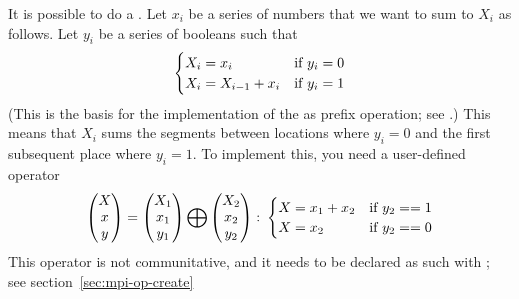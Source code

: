 It is possible to do a . Let $x_i$ be a series of numbers
that we want to sum to $X_i$ as follows. Let $y_i$ be a series of booleans such that
\[ 
\begin{cases}
  X_i=x_i&\hbox{if $y_i=0$}\\
  X_i=X_{i-1}+x_i&\hbox{if $y_i=1$}
\end{cases}
\]
(This is the basis for the implementation of the 
as prefix operation; see .)
This means that $X_i$ sums the segments between locations where $y_i=0$ and the
first subsequent place where $y_i=1$. To implement this, you need a user-defined operator
\[ 
\begin{pmatrix}  X\\ x\\ y\end{pmatrix}
=
\begin{pmatrix}  X_1\\ x_1\\ y_1\end{pmatrix}
\bigoplus
\begin{pmatrix}  X_2\\ x_2\\ y_2\end{pmatrix}\colon
  \begin{cases}
    X=x_1+x_2&\hbox{if $y_2==1$}\\ X=x_2&\hbox{if $y_2==0$}
  \end{cases}
\]
This operator is not communitative, and it needs to be declared as such
with ; see section~\ref{sec:mpi-op-create}


